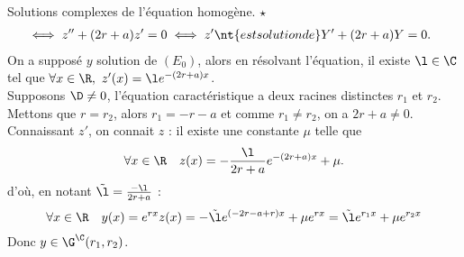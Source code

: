 \documentclass[11pt]{article}
\begin{document}
\begin{thm}{Solutions complexes de l'équation homogène. $\star$}{}
\begin{align*}
        &\iff z'' + (2r + a)z' = 0 \iff z' \nt{ est solution de } Y'+(2r+a)Y=0.
    \end{align*}
    On a supposé $y$ solution de $(E_0)$, alors en résolvant l'équation, il existe $\l\in\C$ tel que $\forall x \in \R, ~ z'(x)=\l e^{-(2r+a)x}$.\\
    Supposons $\D\neq0$, l'équation caractéristique a deux racines distinctes $r_1$ et $r_2$. Mettons que $r=r_2$, alors $r_1=-r-a$ et comme $r_1\neq r_2$, on a $2r+a\neq0$. Connaissant $z'$, on connait $z$ : il existe une constante $\mu$ telle que
    \begin{equation*}
        \forall x \in \R \quad z(x)= -\frac{\l}{2r+a}e^{-(2r+a)x}+\mu.
    \end{equation*}
    d'où, en notant $\tilde{\l}=\frac{-\l}{2r+a}$ :
    \begin{equation*}
        \forall x \in \R \quad y(x)=e^{rx}z(x)=-\tilde{\l}e^{(-2r-a+r)x}+\mu e^{rx} = \tilde{\l}e^{r_1x}+\mu e^{r_2x}
    \end{equation*}
    Donc $y\in\G^\C(r_1,r_2)$.
\end{thm}

\pagebreak
\end{document}
